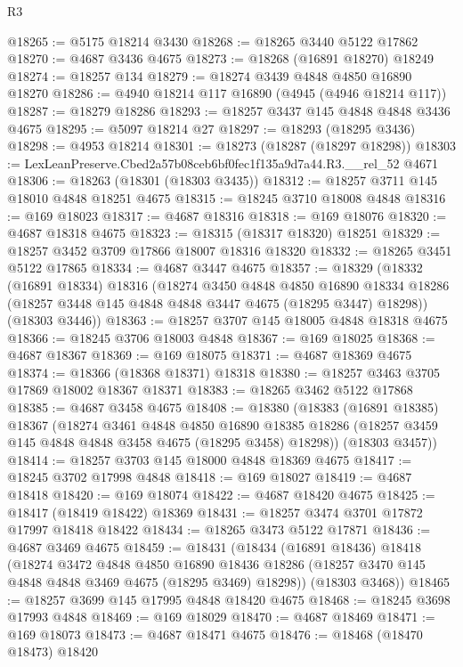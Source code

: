 \begin{lexlean}{R3}
\begin{coremodule}
@18265 := @5175 @18214 @3430
@18268 := @18265 @3440 @5122 @17862
@18270 := @4687 @3436 @4675
@18273 := @18268 (@16891 @18270) @18249
@18274 := @18257 @134
@18279 := @18274 @3439 @4848 @4850 @16890 @18270
@18286 := @4940 @18214 @117 @16890 (@4945 (@4946 @18214 @117))
@18287 := @18279 @18286
@18293 := @18257 @3437 @145 @4848 @4848 @3436 @4675
@18295 := @5097 @18214 @27
@18297 := @18293 (@18295 @3436)
@18298 := @4953 @18214
@18301 := @18273 (@18287 (@18297 @18298))
@18303 := LexLeanPreserve.Cbed2a57b08ceb6bf0fec1f135a9d7a44.R3.__rel_52 @4671
@18306 := @18263 (@18301 (@18303 @3435))
@18312 := @18257 @3711 @145 @18010 @4848 @18251 @4675
@18315 := @18245 @3710 @18008 @4848
@18316 := @169 @18023
@18317 := @4687 @18316
@18318 := @169 @18076
@18320 := @4687 @18318 @4675
@18323 := @18315 (@18317 @18320) @18251
@18329 := @18257 @3452 @3709 @17866 @18007 @18316 @18320
@18332 := @18265 @3451 @5122 @17865
@18334 := @4687 @3447 @4675
@18357 := @18329
    (@18332
      (@16891 @18334)
      @18316
      (@18274
        @3450
        @4848
        @4850
        @16890
        @18334
        @18286
        (@18257 @3448 @145 @4848 @4848 @3447 @4675 (@18295 @3447) @18298))
      (@18303 @3446))
@18363 := @18257 @3707 @145 @18005 @4848 @18318 @4675
@18366 := @18245 @3706 @18003 @4848
@18367 := @169 @18025
@18368 := @4687 @18367
@18369 := @169 @18075
@18371 := @4687 @18369 @4675
@18374 := @18366 (@18368 @18371) @18318
@18380 := @18257 @3463 @3705 @17869 @18002 @18367 @18371
@18383 := @18265 @3462 @5122 @17868
@18385 := @4687 @3458 @4675
@18408 := @18380
    (@18383
      (@16891 @18385)
      @18367
      (@18274
        @3461
        @4848
        @4850
        @16890
        @18385
        @18286
        (@18257 @3459 @145 @4848 @4848 @3458 @4675 (@18295 @3458) @18298))
      (@18303 @3457))
@18414 := @18257 @3703 @145 @18000 @4848 @18369 @4675
@18417 := @18245 @3702 @17998 @4848
@18418 := @169 @18027
@18419 := @4687 @18418
@18420 := @169 @18074
@18422 := @4687 @18420 @4675
@18425 := @18417 (@18419 @18422) @18369
@18431 := @18257 @3474 @3701 @17872 @17997 @18418 @18422
@18434 := @18265 @3473 @5122 @17871
@18436 := @4687 @3469 @4675
@18459 := @18431
    (@18434
      (@16891 @18436)
      @18418
      (@18274
        @3472
        @4848
        @4850
        @16890
        @18436
        @18286
        (@18257 @3470 @145 @4848 @4848 @3469 @4675 (@18295 @3469) @18298))
      (@18303 @3468))
@18465 := @18257 @3699 @145 @17995 @4848 @18420 @4675
@18468 := @18245 @3698 @17993 @4848
@18469 := @169 @18029
@18470 := @4687 @18469
@18471 := @169 @18073
@18473 := @4687 @18471 @4675
@18476 := @18468 (@18470 @18473) @18420

\end{coremodule}
\end{lexlean}
